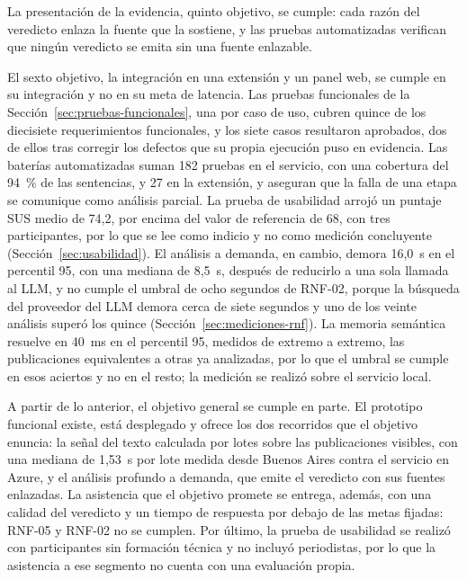 La presentación de la evidencia, quinto objetivo, se cumple: cada razón del veredicto enlaza la fuente que la sostiene, y las pruebas automatizadas verifican que ningún veredicto se emita sin una fuente enlazable.

El sexto objetivo, la integración en una extensión y un panel web, se cumple en su integración y no en su meta de latencia. Las pruebas funcionales de la Sección~\ref{sec:pruebas-funcionales}, una por caso de uso, cubren quince de los diecisiete requerimientos funcionales, y los siete casos resultaron aprobados, dos de ellos tras corregir los defectos que su propia ejecución puso en evidencia. Las baterías automatizadas suman 182 pruebas en el servicio, con una cobertura del 94~\% de las sentencias, y 27 en la extensión, y aseguran que la falla de una etapa se comunique como análisis parcial. La prueba de usabilidad arrojó un puntaje SUS medio de 74,2, por encima del valor de referencia de 68, con tres participantes, por lo que se lee como indicio y no como medición concluyente (Sección~\ref{sec:usabilidad}). El análisis a demanda, en cambio, demora 16,0~s en el percentil 95, con una mediana de 8,5~s, después de reducirlo a una sola llamada al LLM, y no cumple el umbral de ocho segundos de RNF-02, porque la búsqueda del proveedor del LLM demora cerca de siete segundos y uno de los veinte análisis superó los quince (Sección~\ref{sec:mediciones-rnf}). La memoria semántica resuelve en 40~ms en el percentil 95, medidos de extremo a extremo, las publicaciones equivalentes a otras ya analizadas, por lo que el umbral se cumple en esos aciertos y no en el resto; la medición se realizó sobre el servicio local.

A partir de lo anterior, el objetivo general se cumple en parte. El prototipo funcional existe, está desplegado y ofrece los dos recorridos que el objetivo enuncia: la señal del texto calculada por lotes sobre las publicaciones visibles, con una mediana de 1,53~s por lote medida desde Buenos Aires contra el servicio en Azure, y el análisis profundo a demanda, que emite el veredicto con sus fuentes enlazadas. La asistencia que el objetivo promete se entrega, además, con una calidad del veredicto y un tiempo de respuesta por debajo de las metas fijadas: RNF-05 y RNF-02 no se cumplen. Por último, la prueba de usabilidad se realizó con participantes sin formación técnica y no incluyó periodistas, por lo que la asistencia a ese segmento no cuenta con una evaluación propia.

